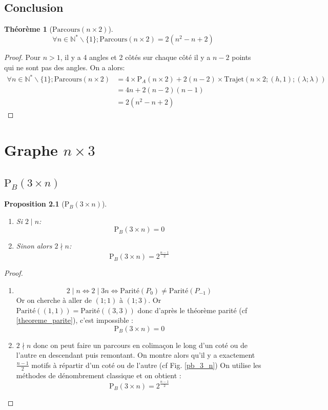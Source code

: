 \documentclass[twoside, a4paper, 12pt]{report}
\newtheorem{theorem}{Théorème}[chapter]
\newtheorem{property}[theorem]{Proposition}
\newcommand{\parite}[1]{\ensuremath{\text{Parité}(#1)}}
\newcommand{\parcours}[2]{\ensuremath{\text{Parcours}(#1 \times #2)}}
\newcommand{\trajet}[6]{\ensuremath{\text{Trajet}\left(#1 \times #2; (#3, #4); (#5; #6)\right)}}
\newcommand{\pa}[2]{\ensuremath{\text{P}_A\left(#1 \times #2\right)}}
\newcommand{\pb}[2]{\ensuremath{\text{P}_B\left(#1 \times #2\right)}}
\begin{document}
\section{Conclusion}
\begin{theorem}[\parcours{n}{2}]
$$\forall n \in \mathbb{N^*} \backslash \{1\}; \parcours{n}{2} = 2(n^2 - n + 2)$$
\end{theorem}

\begin{proof}
Pour $ n > 1$, il y a 4 angles et 2 côtés sur chaque côté il y a $n - 2$ points qui ne sont pas des angles. On a alors:
\begin{align}
\forall n \in \mathbb{N^*} \backslash \{1\}; \parcours{n}{2} &= 4\times\pa{n}{2} + 2(n-2)\times\trajet{n}{2}{h}{1}{\lambda}{\lambda} \\
&= 4n + 2(n-2)(n-1) \\
&= 2(n^2 - n + 2)
\end{align}
\end{proof}


\chapter{Graphe $n \times 3$}

\section{\pb{3}{n}}

\begin{property}[\pb{3}{n}]\ \newline \label{prop_pb_3_n}

\begin{enumerate}
\item Si $2 \mid n$: \[\pb{3}{n} = 0\]
\item Sinon alors $2 \nmid n$: \[\pb{3}{n} = 2^{\frac{n-1}{2}}\]
\end{enumerate}
\end{property}

\begin{proof}
\begin{enumerate}
\item \[2 \mid n \Leftrightarrow 2 \mid 3n \Leftrightarrow \parite{P_0} \not= \parite{P_{-1}}\]
Or on cherche à aller de $(1; 1)$ à $(1; 3)$. Or $\parite{(1, 1)} = \parite{(3, 3)}$ donc d'après le théorème parité (cf \ref{theoreme_parite}), c'est impossible :
\[\pb{3}{n} = 0 \]

\item $2 \nmid n$ donc on peut faire un parcours en colimaçon le long d'un coté ou de l'autre en descendant puis remontant. On montre alors qu'il y a exactement $\frac{n-1}{2}$ motifs à répartir d'un coté ou de l'autre (cf Fig. \ref{pb_3_n}) On utilise les méthodes de dénombrement classique et on obtient :
\[\pb{3}{n} = 2^{\frac{n-1}{2}}\]
\end{enumerate}
\end{proof}
\end{document}
